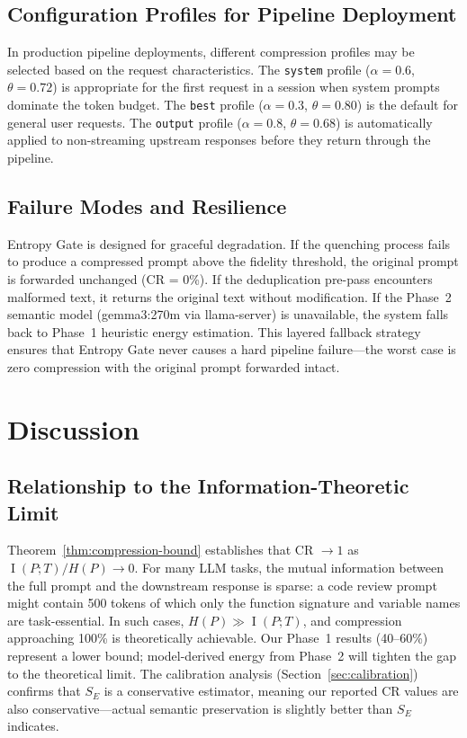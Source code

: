 \documentclass[11pt]{article}
\theoremstyle{remark}
\DeclareMathOperator{\MI}{I}
\begin{document}
\subsection{Configuration Profiles for Pipeline Deployment}

In production pipeline deployments, different compression profiles may
be selected based on the request characteristics. The \texttt{system}
profile ($\alpha = 0.6$, $\theta = 0.72$) is appropriate for the
first request in a session when system prompts dominate the token budget.
The \texttt{best} profile ($\alpha = 0.3$, $\theta = 0.80$) is the
default for general user requests. The \texttt{output} profile
($\alpha = 0.8$, $\theta = 0.68$) is automatically applied to
non-streaming upstream responses before they return through the pipeline.

\subsection{Failure Modes and Resilience}

Entropy Gate is designed for graceful degradation. If the quenching
process fails to produce a compressed prompt above the fidelity threshold,
the original prompt is forwarded unchanged (CR = 0\%). If the deduplication
pre-pass encounters malformed text, it returns the original text without
modification. If the Phase~2 semantic model (gemma3:270m via llama-server)
is unavailable, the system falls back to Phase~1 heuristic energy
estimation. This layered fallback strategy ensures that Entropy Gate never
causes a hard pipeline failure---the worst case is zero compression with
the original prompt forwarded intact.

\section{Discussion}
\label{sec:discussion}

\subsection{Relationship to the Information-Theoretic Limit}

Theorem~\ref{thm:compression-bound} establishes that CR $\to 1$ as
$\MI(P; T)/H(P) \to 0$. For many LLM tasks, the mutual information between
the full prompt and the downstream response is sparse: a code review prompt
might contain 500 tokens of which only the function signature and variable
names are task-essential. In such cases, $H(P) \gg \MI(P; T)$, and
compression approaching 100\% is theoretically achievable. Our Phase~1 results
(40--60\%) represent a lower bound; model-derived energy from Phase~2
will tighten the gap to the theoretical limit. The calibration analysis
(Section~\ref{sec:calibration}) confirms that $S_E$ is a conservative
estimator, meaning our reported CR values are also conservative---actual
semantic preservation is slightly better than $S_E$ indicates.
\end{document}
